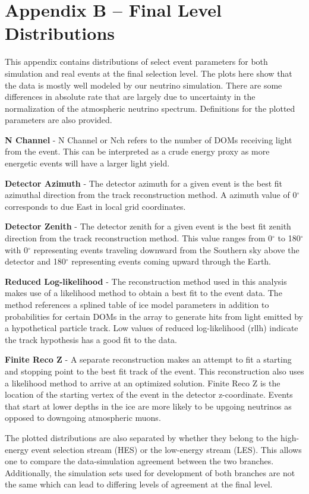 \documentclass{gatech-thesis}
\begin{document}
\chapter{Appendix B -- Final Level Distributions}
This appendix contains distributions of select event parameters for both simulation and real events at the final selection level. The plots here show that the data is mostly well modeled by our neutrino simulation. There are some differences in absolute rate that are largely due to uncertainty in the normalization of the atmospheric neutrino spectrum. Definitions for the plotted parameters are also provided.
\begin{adjustwidth}{2.5em}{2.5em}
\setlength{\parindent}{0pt}
\textbf{N Channel} - N Channel or Nch refers to the number of DOMs receiving light from the event. This can be interpreted as a crude energy proxy as more energetic events will have a larger light yield.

\textbf{Detector Azimuth} - The detector azimuth for a given event is the best fit azimuthal direction from the track reconstruction method. A azimuth value of 0$^{\circ}$ corresponds to due East in local grid coordinates.

\textbf{Detector Zenith} - The detector zenith for a given event is the best fit zenith direction from the track reconstruction method. This value ranges from 0$^{\circ}$ to 180$^{\circ}$ with 0$^{\circ}$ representing events traveling downward from the Southern sky above the detector and 180$^{\circ}$ representing events coming upward through the Earth.

\textbf{Reduced Log-likelihood} - The reconstruction method used in this analysis makes use of a likelihood method to obtain a best fit to the event data. The method references a splined table of ice model parameters in addition to probabilities for certain DOMs in the array to generate hits from light emitted by a hypothetical particle track. Low values of reduced log-likelihood (rllh) indicate the track hypothesis has a good fit to the data.

\textbf{Finite Reco Z} - A separate reconstruction makes an attempt to fit a starting and stopping point to the best fit track of the event. This reconstruction also uses a likelihood method to arrive at an optimized solution. Finite Reco Z is the location of the starting vertex of the event in the detector z-coordinate. Events that start at lower depths in the ice are more likely to be upgoing neutrinos as opposed to downgoing atmospheric muons.
\end{adjustwidth}
The plotted distributions are also separated by whether they belong to the high-energy event selection stream (HES) or the low-energy stream (LES). This allows one to compare the data-simulation agreement between the two branches. Additionally, the simulation sets used for development of both branches are not the same which can lead to differing levels of agreement at the final level.
\end{document}
